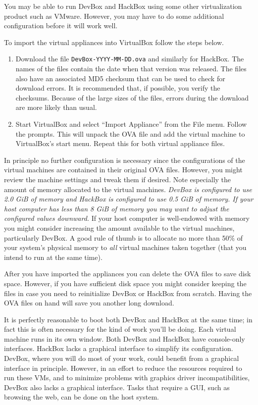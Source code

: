 \documentclass{article}
\begin{document}
You may be able to run DevBox and HackBox using some other virtualization product such as
VMware. However, you may have to do some additional configuration before it will work well.

To import the virtual appliances into VirtualBox follow the steps below.

\begin{enumerate}

\item Download the file \texttt{DevBox-YYYY-MM-DD.ova} and similarly for HackBox. The names of
  the files contain the date when that version was released. The files also have an associated
  MD5 checksum that can be used to check for download errors. It is recommended that, if
  possible, you verify the checksums. Because of the large sizes of the files, errors during the
  download are more likely than usual.

\item Start VirtualBox and select ``Import Appliance'' from the File menu. Follow the prompts.
  This will unpack the OVA file and add the virtual machine to VirtualBox's start menu. Repeat
  this for both virtual appliance files.

\end{enumerate}

In principle no further configuration is necessary since the configurations of the virtual
machines are contained in their original OVA files. However, you might review the machine
settings and tweak them if desired. Note especially the amount of memory allocated to the
virtual machines. \emph{DevBox is configured to use 2.0 GiB of memory and HackBox is configured
to use 0.5 GiB of memory. If your host computer has less than 8 GiB of memory you may want to
adjust the configured values downward.} If your host computer is well-endowed with memory you
might consider increasing the amount available to the virtual machines, particularly DevBox. A
good rule of thumb is to allocate no more than 50\% of your system's physical memory to
\emph{all} virtual machines taken together (that you intend to run at the same time).

After you have imported the appliances you can delete the OVA files to save disk space. However,
if you have sufficient disk space you might consider keeping the files in case you need to
reinitialize DevBox or HackBox from scratch. Having the OVA files on hand will save you another
long download.

It is perfectly reasonable to boot both DevBox and HackBox at the same time; in fact this is
often necessary for the kind of work you'll be doing. Each virtual machine runs in its own
window. Both DevBox and HackBox have console-only interfaces. HackBox lacks a graphical
interface to simplify its configuration. DevBox, where you will do most of your work, could
benefit from a graphical interface in principle. However, in an effort to reduce the resources
required to run these VMs, and to minimize problems with graphics driver incompatibilities,
DevBox also lacks a graphical interface. Tasks that require a GUI, such as browsing the web, can
be done on the host system.
\end{document}
